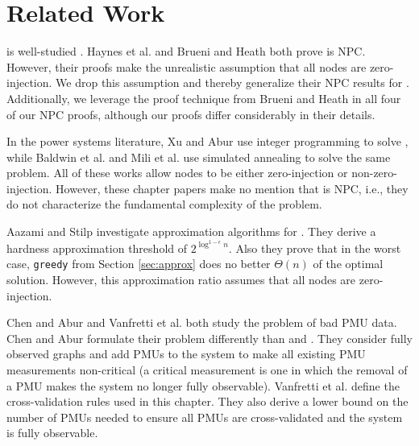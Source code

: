 \section{Related Work}
\label{sec:related-pmu}

\full is well-studied \cite{Baldwin93,Brueni05,Haynes02, Mili90, Xu04}.  
Haynes et al. \cite{Haynes02} and Brueni and Heath \cite{Brueni05} both prove \full is NPC.  
However, their proofs make the unrealistic assumption that all nodes are zero-injection.  We drop this assumption and thereby generalize their NPC results for \fulls.
Additionally, we leverage the proof technique from Brueni and Heath \cite{Brueni05} in all four of our NPC proofs, although our proofs
differ considerably in their details. 

In the power systems literature, Xu and Abur \cite{Xu04,Xu05} use integer programming to solve \fulls, while Baldwin et al. \cite{Baldwin93} and Mili et al. \cite{Mili90} use simulated annealing 
to solve the same problem. All of these works allow nodes to be either zero-injection or non-zero-injection.  However,
these chapter papers make no mention that \full is NPC, i.e., they do not characterize the fundamental complexity of the problem. 

Aazami and Stilp \cite{Aazami07} investigate approximation algorithms for \fulls.  They derive a hardness approximation threshold of $2^{\log^{1 -\epsilon}n}$.
Also they prove that in the worst case, {\tt greedy} from Section \ref{sec:approx} does no better $\Theta(n)$ of the optimal solution.  However, this approximation ratio assumes that 
all nodes are zero-injection.

Chen and Abur \cite{Abur06} and Vanfretti et al. \cite{Vanfretti10} both study the problem of bad PMU data. Chen and Abur \cite{Abur06} formulate their problem differently than \xval and \xvalparts.  
They consider fully observed graphs and add PMUs to the system to make all existing PMU measurements non-critical 
(a critical measurement is one in which the removal of a PMU makes the system
no longer fully observable). Vanfretti et al. \cite{Vanfretti10} define the cross-validation rules used in this chapter.  They also derive a
lower bound on the number of PMUs needed to ensure all PMUs are cross-validated and the system is fully observable. 

